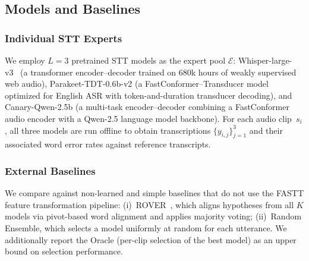 \documentclass[journal]{IEEEtran}
\begin{document}
    \subsection{Models and Baselines}
    \label{subsec:models_baselines}

    \subsubsection{Individual STT Experts}
    We employ $L\!=\!3$ pretrained STT models as the expert pool $\mathcal{E}$:
    Whisper-large-v3~\cite{radford2022whisper} (a transformer encoder--decoder
    trained on 680k hours of weakly supervised web audio), Parakeet-TDT-0.6b-v2 (a
    FastConformer--Transducer model optimized for English ASR with token-and-duration
    transducer decoding), and Canary-Qwen-2.5b (a multi-task encoder--decoder
    combining a FastConformer audio encoder with a Qwen-2.5 language model
    backbone). For each audio clip~$s_{i}$, all three models are run offline to obtain
    transcriptions $\{y_{i,j}\}_{j=1}^{3}$ and their associated word error rates
    against reference transcripts.

    \subsubsection{External Baselines}
    We compare against non-learned and simple baselines that do not use the FASTT
    feature transformation pipeline: (i)~ROVER~\cite{fiscus1997rover}, which aligns
    hypotheses from all $K$ models via pivot-based word alignment and applies majority
    voting; (ii)~Random Ensemble, which selects a model uniformly at random for each
    utterance. We additionally report the Oracle (per-clip selection of the best
    model) as an upper bound on selection performance.
\end{document}
